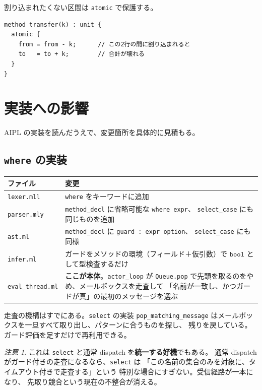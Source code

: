 \documentclass[11pt,a4paper]{ltjsarticle}
\theoremstyle{remark}
\newtheorem{remark}{注意}
\newcommand{\ty}[1]{\ensuremath{\mathtt{#1}}}
\begin{document}
割り込まれたくない区間は \texttt{atomic} で保護する。

\begin{lstlisting}[language=AIPL]
method transfer(k) : unit {
  atomic {
    from = from - k;      // この2行の間に割り込まれると
    to   = to + k;        // 合計が壊れる
  }
}
\end{lstlisting}

\section{実装への影響}

AIPL の実装を読んだうえで、変更箇所を具体的に見積もる。

\subsection{\texttt{where} の実装}

\begin{center}
\small
\begin{tabular}{@{}lp{9.4cm}@{}}
\toprule
ファイル & 変更 \\
\midrule
\texttt{lexer.mll}   & \texttt{where} をキーワードに追加 \\
\texttt{parser.mly}  & \texttt{method\_decl} に省略可能な \texttt{where expr}、
  \texttt{select\_case} にも同じものを追加 \\
\texttt{ast.ml}      & \texttt{method\_decl} に \texttt{guard : expr option}、
  \texttt{select\_case} にも同様 \\
\texttt{infer.ml}    & ガードをメソッドの環境（フィールド＋仮引数）で
  \ty{bool} として型検査するだけ \\
\texttt{eval\_thread.ml} & \textbf{ここが本体}。\texttt{actor\_loop} が
  \texttt{Queue.pop} で先頭を取るのをやめ、メールボックスを走査して
  「名前が一致し、かつガードが真」の最初のメッセージを選ぶ \\
\bottomrule
\end{tabular}
\end{center}

走査の機構はすでにある。\texttt{select} の実装 \texttt{pop\_matching\_message}
はメールボックスを一旦すべて取り出し、パターンに合うものを探し、
残りを戻している。ガード評価を足すだけで再利用できる。

\begin{remark}
これは \texttt{select} と通常 dispatch を\textbf{統一する好機}でもある。
通常 dispatch がガード付きの走査になるなら、\texttt{select} は
「この名前の集合のみを対象に、タイムアウト付きで走査する」という
特別な場合にすぎない。受信経路が一本になり、
先取り競合という現在の不整合が消える。
\end{remark}
\end{document}

